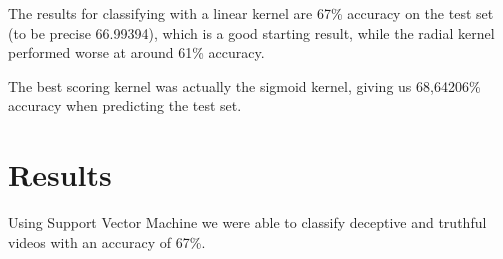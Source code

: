 The results for classifying with a linear kernel are 67\% accuracy on the test set (to be precise 66.99394), which is a good starting result, while the radial kernel performed worse at around 61\% accuracy.

The best scoring kernel was actually the sigmoid kernel, giving us 68,64206\% accuracy when predicting the test set.

\clearpage

\section{Results} \label{results}
Using Support Vector Machine we were able to classify deceptive and truthful videos with an accuracy of 67\%.
